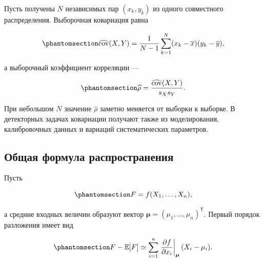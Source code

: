 \documentclass[
  russian,
  11pt,
  a4paper,
  open=any]{scrbook}
\begin{document}
Пусть получены \(N\) независимых пар \((x_k,y_k)\) из одного совместного
распределения. Выборочная ковариация равна

\begin{equation}\protect\phantomsection\label{eq-ch6-sample-covariance}{
\widehat{\operatorname{cov}}(X,Y)
=\frac1{N-1}\sum_{k=1}^{N}
(x_k-\overline x)(y_k-\overline y),
}\end{equation}

а выборочный коэффициент корреляции ---

\begin{equation}\protect\phantomsection\label{eq-ch6-sample-correlation}{
\widehat\rho
=\frac{\widehat{\operatorname{cov}}(X,Y)}{s_Xs_Y}.
}\end{equation}

При небольшом \(N\) значение \(\widehat\rho\) заметно меняется от
выборки к выборке. В детекторных задачах ковариации получают также из
моделирования, калибровочных данных и вариаций систематических
параметров.

\subsection{Общая формула
распространения}\label{ux43eux431ux449ux430ux44f-ux444ux43eux440ux43cux443ux43bux430-ux440ux430ux441ux43fux440ux43eux441ux442ux440ux430ux43dux435ux43dux438ux44f}

Пусть

\begin{equation}\protect\phantomsection\label{eq-ch6-multivariable-transformation}{
F=f(X_1,\ldots,X_n),
}\end{equation}

а средние входных величин образуют вектор
\(\boldsymbol\mu=(\mu_1,\ldots,\mu_n)^{\mathsf T}\). Первый порядок
разложения имеет вид

\begin{equation}\protect\phantomsection\label{eq-ch6-multivariable-linearization}{
F-\mathbb E[F]
\simeq
\sum_{i=1}^{n}
\left.
\frac{\partial f}{\partial x_i}
\right|_{\boldsymbol\mu}
(X_i-\mu_i).
}\end{equation}
\end{document}
